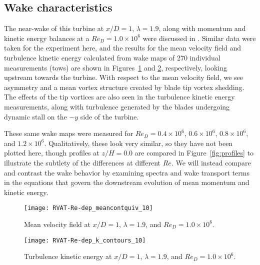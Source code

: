 \subsection{Wake characteristics}

The near-wake of this turbine at $x/D=1$, $\lambda=1.9$, along with momentum and
kinetic energy balances at a $Re_D = 1.0 \times 10^6$ were discussed in
\cite{Bachant2015-JoT}. Similar data were taken for the experiment here, and the
results for the mean velocity field and turbulence kinetic energy calculated
from wake maps of 270 individual measurements (tows) are shown in
Figures~\ref{fig:meancontquiv} and \ref{fig:kcont}, respectively, looking
upstream towards the turbine. With respect to the mean velocity field, we see
asymmetry and a mean vortex structure created by blade tip vortex shedding. The
effects of the tip vortices are also seen in the turbulence kinetic energy
measurements, along with turbulence generated by the blades undergoing dynamic
stall on the $-y$ side of the turbine.

These same wake maps were measured for $Re_D = 0.4 \times 10^6$, $0.6 \times
10^6$, $0.8 \times 10^6$, and $1.2 \times 10^6$. Qualitatively, these look very
similar, so they have not been plotted here, though profiles at $z/H=0.0$ are
compared in Figure~\ref{fig:profiles} to illustrate the subtlety of the
differences at different $Re$. We will instead compare and contrast the wake
behavior by examining spectra and wake transport terms in the equations that
govern the downstream evolution of mean momentum and kinetic energy.

\begin{figure}
    \centering
    
    \texttt{[image: RVAT-Re-dep\_meancontquiv\_10]}
    
    \caption{Mean velocity field at $x/D=1$, $\lambda=1.9$, and $Re_D=1.0 \times
        10^6$.}
    
    \label{fig:meancontquiv}
\end{figure}

\begin{figure}
    \centering
    
    \texttt{[image: RVAT-Re-dep\_k\_contours\_10]}
    
    \caption{Turbulence kinetic energy at $x/D=1$, $\lambda=1.9$, and $Re_D=1.0
        \times 10^6$.}
    
    \label{fig:kcont}
\end{figure}

